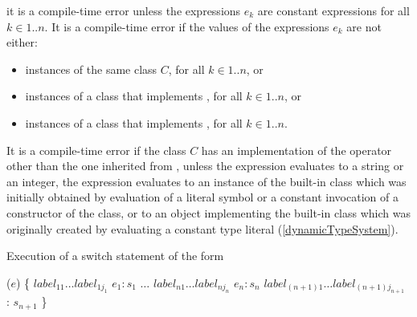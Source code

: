 \documentclass[makeidx]{article}
\begin{document}
{it is a compile-time error unless the expressions $e_k$ are constant expressions for all $k \in 1 .. n$.
It is a compile-time error if the values of the expressions $e_k$ are not either:
\begin{itemize}
\item instances of the same class $C$, for all $k \in 1 .. n$, or
\item instances of a class that implements , for all $k \in 1 .. n$, or
\item instances of a class that implements , for all $k \in 1 .. n$.
\end{itemize}


\LMHash{}%
It is a compile-time error if the class $C$ has an implementation of
the operator \code{==} other than the one inherited from ,
unless the expression evaluates to a string or an integer,
the expression evaluates to an instance of the built-in
class  which was initially obtained by evaluation of a
literal symbol or
a constant invocation of a constructor of the  class,
or to an object implementing the built-in class 
which was originally created by evaluating a constant type literal
(\ref{dynamicTypeSystem}).



\LMHash{}%
Execution of a switch statement of the form

\begin{normativeDartCode}
\SWITCH{} ($e$) \{
   $label_{11} \ldots label_{1j_1}$ \CASE{} $e_1: s_1$
   $\ldots$
   $label_{n1} \ldots label_{nj_n}$ \CASE{} $e_n: s_n$
   $label_{(n+1)1} \ldots label_{(n+1)j_{n+1}}$ \DEFAULT{}: $s_{n+1}$
\}
\end{normativeDartCode}

}
\end{document}
